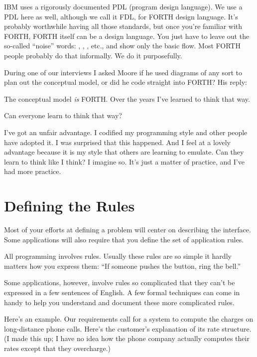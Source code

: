 \begin{tfquot}
IBM uses a rigorously documented PDL (program design language). We use
a PDL here as well, although we call it FDL, for FORTH design
language. It's probably worthwhile having all those standards, but
once you're familiar with FORTH, FORTH itself can be a design
language. You just have to leave out the so-called ``noise'' words:
, , , etc., and show only the basic
flow. Most FORTH people probably do that informally. We do it purposefully.
\end{tfquot}
During one of our interviews I asked Moore if he used
diagrams of any sort to plan out the conceptual model, or did he code
straight into FORTH? His reply:

\begin{tfquot}
The conceptual model \emph{is} FORTH. Over the years I've learned to think that way.
\end{tfquot}
Can everyone learn to think that way?

\begin{tfquot}
I've got an unfair advantage. I codified my programming style and other
people have adopted it. I was surprised that this happened. And I feel at a
lovely advantage because it is my style that others are learning to emulate.
Can they learn to think like I think? I imagine so. It's just a matter of
practice, and I've had more practice.
\end{tfquot}
\blackline{2ex}

\section{Defining the Rules}

Most of your efforts at defining a problem will center on describing the
interface. Some applications will also require that you define the set of
application rules.

All programming involves rules. Usually these rules are so simple it
hardly matters how you express them: ``If someone pushes the button,
ring the bell.''

Some applications, however, involve rules so complicated that they
can't be expressed in a few sentences of English. A few formal techniques
can come in handy to help you understand and document these more
complicated rules.

Here's an example. Our requirements call for a system to compute
the charges on long-distance phone calls. Here's the customer's
explanation of its rate structure. (I made this up; I have no idea how the phone
company actually computes their rates except that they overcharge.)

